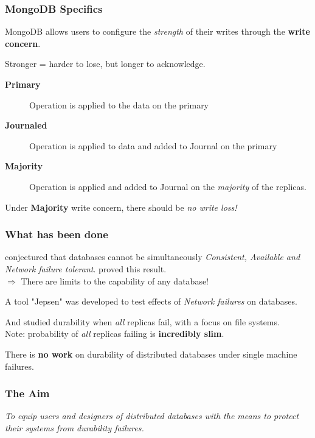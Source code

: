 \documentclass[numfooter,sectionpages,protectFrameTitle, progressbar, cblock, valigncolumns, addlogo]{beamer}
\begin{document}
\begin{frame}
    \frametitle{MongoDB Specifics}

    MongoDB allows users to configure the \textit{strength} of their writes through the \textbf{write concern}. 
    
    Stronger = harder to lose, but longer to acknowledge.

    \pause

    \begin{description}
        \item[\textbf{Primary}] Operation is applied to the data on the primary
        \item[\textbf{Journaled}] Operation is applied to data and added to Journal on the primary
        \item[\textbf{Majority}] Operation is applied and added to Journal on the \textit{majority} of the replicas.
    \end{description}

    \pause 

    Under \textbf{Majority} write concern, there should be \textit{no write loss!}

\end{frame}

\begin{frame}
    \frametitle{What has been done}
    \citet{cap} conjectured that databases cannot be simultaneously \textit{Consistent, Available and Network failure tolerant}. \citet{cap-proof} proved this result. \\
    $\Rightarrow$ There are limits to the capability of any database!

    A tool "Jepsen" was developed to test effects of \textit{Network failures} on databases. \citep{jepsen-2013, jepsen-2017, jepsen-2018}

    And \citet{correlated-crash} studied durability when \textit{all} replicas fail, with a focus on file systems. \\
    Note: probability of \textit{all} replicas failing is \textbf{incredibly slim}.

    \begin{center}
        There is \textbf{no work} on durability of distributed databases under single machine failures.
    \end{center}

\end{frame}

\begin{frame}
    \frametitle{The Aim}
    \begin{center}
        \textit{
            To equip users and designers of distributed databases with the means to protect their systems from durability failures.
        }
    \end{center}
\end{frame}
\end{document}
